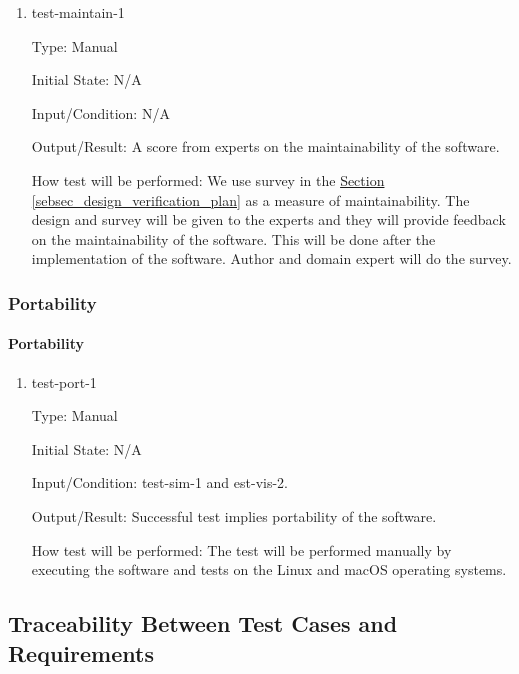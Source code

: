 \documentclass[12pt, titlepage]{article}
\begin{document}
\begin{enumerate}

\item{test-maintain-1\\}

Type: Manual
					
Initial State: N/A
					
Input/Condition: N/A
					
Output/Result: A score from experts on the maintainability of the software.
					
How test will be performed: We use survey in the 
\hyperref[sebsec_design_verification_plan]{Section \ref*{sebsec_design_verification_plan}} as 
a measure of maintainability. The design and survey will be given to the experts and 
they will provide feedback on the maintainability of the software.
This will be done after the implementation of the software.
Author and domain expert will do the survey.

\end{enumerate}

\subsubsection{Portability}

\paragraph{Portability}

\begin{enumerate}

\item{test-port-1\\}

Type: Manual
					
Initial State: N/A
					
Input/Condition: test-sim-1 and est-vis-2. 
					
Output/Result: Successful test implies portability of the software.
					
How test will be performed: The test will be performed manually 
by executing the software and tests on the Linux and macOS operating systems.

\end{enumerate}

\subsection{Traceability Between Test Cases and Requirements}
\end{document}
